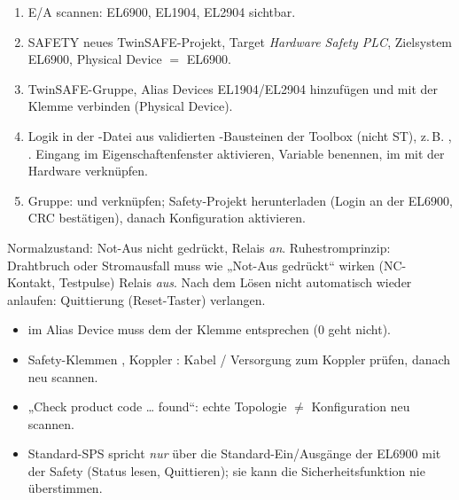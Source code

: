 \begin{rezept}
\begin{enumerate}
\item E/A scannen: EL6900, EL1904, EL2904 sichtbar.
\item SAFETY \ra neues TwinSAFE-Projekt, Target \emph{Hardware Safety
  PLC}, Zielsystem EL6900, Physical Device $=$ EL6900.
\item TwinSAFE-Gruppe, Alias Devices EL1904/EL2904 hinzufügen und mit
  der Klemme verbinden (Physical Device).
\item Logik in der -Datei  aus validierten
  -Bausteinen der Toolbox (nicht ST), z.\,B. ,
  . Eingang im Eigenschaftenfenster aktivieren, Variable
  benennen, im  mit der Hardware verknüpfen.
\item Gruppe:  und  verknüpfen; Safety-Projekt
  herunterladen (Login an der EL6900, CRC bestätigen), danach
  Konfiguration aktivieren.
\end{enumerate}
\end{rezept}
\begin{falle}
Normalzustand: Not-Aus nicht gedrückt, Relais \emph{an}. Ruhestromprinzip:
Drahtbruch oder Stromausfall muss wie „Not-Aus gedrückt“ wirken
(NC-Kontakt, Testpulse) \ra Relais \emph{aus}. Nach dem Lösen nicht
automatisch wieder anlaufen: Quittierung (Reset-Taster) verlangen.
\end{falle}
\begin{falle}
\begin{itemize}\setlength\itemsep{0pt}
\item {} im Alias Device muss dem  der
  Klemme entsprechen (0 geht nicht).
\item Safety-Klemmen , Koppler : Kabel /
  Versorgung zum Koppler prüfen, danach neu scannen.
\item „Check product code … found“: echte Topologie $\ne$ Konfiguration
  \ra neu scannen.
\item Standard-SPS spricht \emph{nur} über die Standard-Ein/Ausgänge der
  EL6900 mit der Safety (Status lesen, Quittieren); sie kann die
  Sicherheitsfunktion nie überstimmen.
\end{itemize}
\end{falle}
